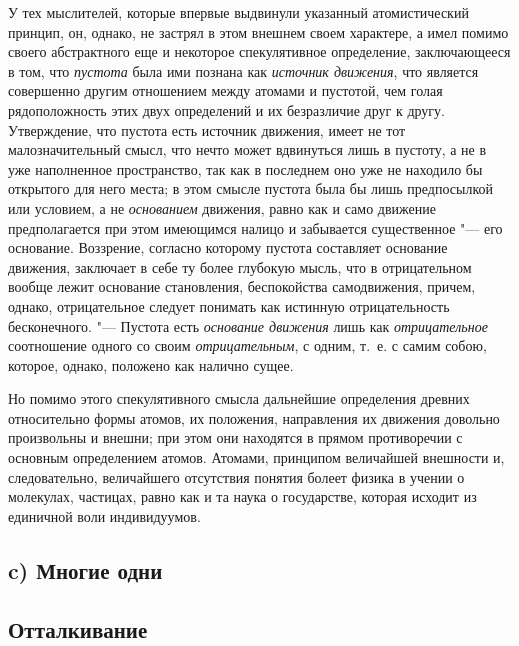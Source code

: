 У тех мыслителей, которые впервые выдвинули указанный атомистический
принцип, он, однако, не застрял в этом внешнем своем характере, а имел
помимо своего абстрактного еще и некоторое спекулятивное определение,
заключающееся в том, что {\em пустота} была ими познана
как {\em источник движения}, что является совершенно
другим отношением между атомами и пустотой, чем голая рядоположность этих
двух определений и их безразличие друг к другу. Утверждение, что пустота
есть источник движения, имеет не тот малозначительный смысл, что нечто
может вдвинуться лишь в пустоту, а не в уже наполненное пространство, так
как в последнем оно уже не находило бы открытого для него места; в этом
смысле пустота была бы лишь предпосылкой или условием, а не
{\em основанием} движения, равно как и само движение
предполагается при этом имеющимся налицо и забывается существенное "--- его
основание. Воззрение, согласно которому пустота составляет основание
движения, заключает в себе ту более глубокую мысль, что в отрицательном
вообще лежит основание становления, беспокойства самодвижения, причем,
однако, отрицательное следует понимать как истинную отрицательность
бесконечного. "--- Пустота есть {\em основание движения}
лишь как {\em отрицательное} соотношение одного со
своим {\em отрицательным}, с одним, т.~е. с самим
собою, которое, однако, положено как налично сущее.

Но помимо этого спекулятивного смысла дальнейшие определения древних
относительно формы атомов, их положения, направления их движения довольно
произвольны и внешни; при этом они находятся в прямом противоречии с
основным определением атомов. Атомами, принципом величайшей внешности и,
следовательно, величайшего отсутствия понятия болеет физика в учении о
молекулах, частицах, равно как и та наука о государстве, которая исходит из
единичной воли индивидуумов.

\subsection[c) Многие одни. Отталкивание]%
{c) Многие одни\\\vspace{2mm}\\{\mdseries\lsstyle Отталкивание}}

